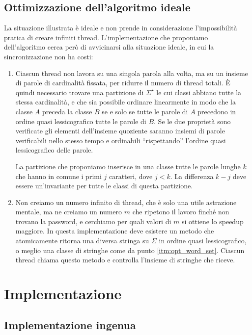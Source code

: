 \documentclass[]{myarticle}
\begin{document}
\subsection{Ottimizzazione dell'algoritmo ideale}

La situazione illustrata \`e ideale e non prende in considerazione l'impossibilit\`a pratica di creare infiniti thread.
L'implementazione che proponiamo dell'algoritmo cerca per\`o di avvicinarsi alla situazione ideale, in cui la sincronizzazione non ha costi:
\begin{enumerate}
	\item \label{itm:opt_word_set} Ciascun thread non lavora su una singola parola alla volta, ma su un insieme di parole di cardinalit\`a fissata, per ridurre il numero di thread totali.
		\`E quindi necessario trovare una partizione di $\Sigma^{\star}$ le cui classi abbiano tutte la stessa cardinalit\`a, e che sia possibile ordinare linearmente in modo che la classe $A$  preceda la classe $B$  se e solo se tutte le parole di $A$ precedono in ordine quasi lessicografico tutte le parole di $B$.
		Se le due propriet\`a sono verificate gli elementi dell'insieme quoziente saranno insiemi di parole verificabili nello stesso tempo e ordinabili ``rispettando'' l'ordine quasi lessicografico delle parole.

		La partizione che proponiamo inserisce in una classe tutte le parole lunghe $k$ che hanno in comune i primi $j$ caratteri, dove $j < k$.
		La differenza $k - j$ deve essere un'invariante per tutte le classi di questa partizione.
	\item Non creiamo un numero infinito di thread, che \`e solo una utile astrazione mentale, ma ne creiamo un numero $m$ che ripetono il lavoro finch\'e non trovano la password, e cerchiamo per quali valori di $m$ si ottiene lo speedup maggiore.
		In questa implementazione deve esistere un metodo che atomicamente ritorna una diversa stringa su $\Sigma$ in ordine quasi lessicografico, o meglio una classe di stringhe come da punto \ref{itm:opt_word_set}.
		Ciascun thread chiama questo metodo e controlla l'insieme di stringhe che riceve.
\end{enumerate}

\section{Implementazione}

\subsection{Implementazione ingenua}
\end{document}
